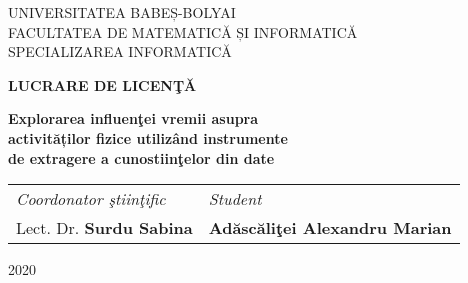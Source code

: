 \documentclass[a4paper, 12pt]{report}
\def\blankpage{%
      \clearpage%
      \thispagestyle{empty}%
      \addtocounter{page}{-1}%
      \null%
      \clearpage}
\begin{document}
\begin{titlepage}

\sloppy

\begin{center}

\normalsize{UNIVERSITATEA BABEȘ-BOLYAI\\}
\vspace{0.25cm}
\normalsize{FACULTATEA DE MATEMATICĂ ȘI INFORMATICĂ\\}
\vspace{0.25cm}
\normalsize{SPECIALIZAREA INFORMATICĂ}

\end{center}

\vspace{4cm}

\begin{center}
\Large \textbf{LUCRARE DE LICEN\c T\u A}\\
\vspace{1 cm}

\Huge \textbf{Explorarea influenţei vremii asupra \\ activităților fizice utilizând instrumente \\ de extragere a cunostiinţelor din date}
\end{center}

\vspace{4cm}

\begin{center}

\vspace{1cm}
\begin{tabular}{ll}
\textit{Coordonator \c stiin\c tific}
    \hspace{3cm} & \textit{Student}\\
Lect. Dr. \textbf{Surdu Sabina}      
\hspace{5cm}     & \textbf{Ad\u asc\u ali\c tei Alexandru Marian}\\   
\end{tabular}

\end{center}

\vspace{4cm}

\begin{center}

\normalsize{2020}

\end{center}

\end{titlepage}
\blankpage



\tableofcontents
\listoffigures
\listoftables







\clearpage


\end{document}
